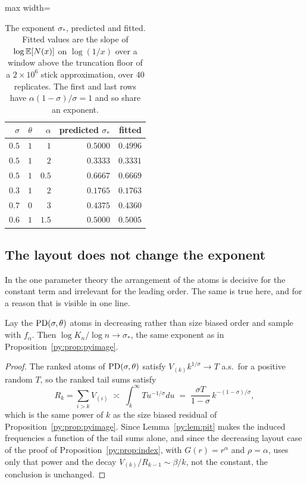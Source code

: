\begin{table}[t]
\centering
\caption{The exponent $\sigma_*$, predicted and fitted. Fitted values are the slope of
$\log \mathbb{E}[N(x)]$ on $\log(1/x)$ over a window above the truncation floor of a $2\times10^{6}$ stick
approximation, over $40$ replicates. The first and last rows have $\alpha(1-\sigma)/\sigma = 1$ and
so share an exponent.}
\label{py:tab:exponent}
\begin{adjustbox}{max width=\textwidth}
\begin{tabular}{rrrrr}
\toprule
$\sigma$ & $\theta$ & $\alpha$ & predicted $\sigma_*$ & fitted \\
\midrule
$0.5$  & $1$ & $1$    & $0.5000$ & $0.4996$ \\
$0.5$  & $1$ & $2$    & $0.3333$ & $0.3331$ \\
$0.5$  & $1$ & $0.5$  & $0.6667$ & $0.6669$ \\
$0.3$  & $1$ & $2$    & $0.1765$ & $0.1763$ \\
$0.7$  & $0$ & $3$    & $0.4375$ & $0.4360$ \\
$0.6$  & $1$ & $1.5$  & $0.5000$ & $0.5005$ \\
\bottomrule
\end{tabular}
\end{adjustbox}
\end{table}

\subsection{The layout does not change the exponent}
\label{py:sec:layout}

In the one parameter theory the arrangement of the atoms is decisive for the constant term and
irrelevant for the leading order. The same is true here, and for a reason that is visible in one
line.

\begin{proposition}
\label{py:prop:layout}
Lay the $\mathrm{PD}(\sigma,\theta)$ atoms in decreasing rather than size biased order and sample with
$f_\alpha$. Then $\log K_n/\log n \to \sigma_*$, the same exponent as in
Proposition~\ref{py:prop:pyimage}.
\end{proposition}

\begin{proof}
The ranked atoms of $\mathrm{PD}(\sigma,\theta)$ satisfy $V_{(k)}k^{1/\sigma} \to T$ a.s.\ for a positive
random $T$, so the ranked tail sums satisfy
\[
R_k = \sum_{i>k}V_{(i)} \;\asymp\; \int_k^\infty T u^{-1/\sigma}du
\;=\; \frac{\sigma T}{1-\sigma}\,k^{-(1-\sigma)/\sigma},
\]
which is the same power of $k$ as the size biased residual of Proposition~\ref{py:prop:pyimage}. Since
Lemma~\ref{py:lem:pit} makes the induced frequencies a function of the tail sums alone, and since the
decreasing layout case of the proof of Proposition~\ref{py:prop:index}, with $G(r) = r^{\alpha}$ and $\rho = \alpha$, uses only that power and the decay $V_{(k)}/R_{k-1} \sim \beta/k$, not the constant, the
conclusion is unchanged.
\end{proof}

